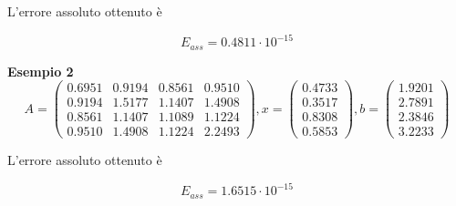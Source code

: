 L'errore assoluto ottenuto è

\[
E_{ass} = 0.4811 \cdot 10^{-15}
\]

\textbf{Esempio 2}
\[
A = \begin{pmatrix}
0.6951 & 0.9194 & 0.8561 & 0.9510\\
0.9194 & 1.5177 & 1.1407 & 1.4908\\
0.8561 & 1.1407 & 1.1089 & 1.1224\\
0.9510 & 1.4908 & 1.1224 & 2.2493
\end{pmatrix}, x = \begin{pmatrix}
0.4733\\
0.3517\\
0.8308\\
0.5853
\end{pmatrix}, b = \begin{pmatrix}
1.9201\\
2.7891\\
2.3846\\
3.2233
\end{pmatrix}
\]

L'errore assoluto ottenuto è

\[
E_{ass} = 1.6515 \cdot 10^{-15}
\]

